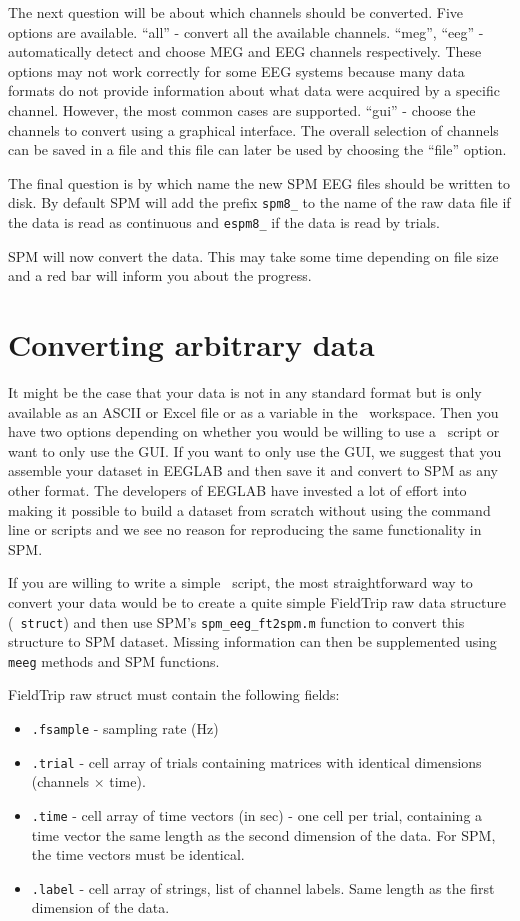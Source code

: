 The next question will be about which channels should be converted. Five options are available. ``all'' - convert all the available channels. ``meg'', ``eeg'' - automatically detect and choose MEG and EEG channels respectively. These options may not work correctly for some EEG systems because many data formats do not provide information about what data were acquired by a specific channel. However, the most common cases are supported. ``gui'' - choose the channels to convert using a graphical interface. The overall selection of channels can be saved in a file and this file can later be used by choosing the ``file'' option.

The final question is by which name the new SPM EEG files should be written to disk. By default SPM will add the prefix \texttt{spm8\_} to the name of the raw data file if the data is read as continuous and \texttt{espm8\_} if the data is read by trials.

SPM will now convert the data. This may take some time depending on file size and a red bar will inform you about the progress.


\section{Converting arbitrary data}
It might be the case that your data is not in any standard format but is only available as an ASCII or Excel file or as a variable in the \matlab\ workspace. Then you have two options depending on whether you would be willing to use a \matlab\ script or want to only use the GUI. If you want to only use the GUI, we suggest that you assemble your dataset in EEGLAB and then  save it and convert to SPM as any other format. The developers of EEGLAB have invested a lot of effort into making it possible to build a dataset from scratch without using the command line or scripts and we see no reason for reproducing the same functionality in SPM.

If you are willing to write a simple \matlab\ script, the most straightforward way to convert your data would be to create a quite simple FieldTrip raw data structure (\matlab\ \texttt{struct}) and then use SPM's \texttt{spm\_eeg\_ft2spm.m} function to convert this structure to SPM dataset. Missing information can then be supplemented using \texttt{meeg} methods and SPM functions.

FieldTrip raw struct must contain the following fields:

\begin{itemize}
\item \texttt{.fsample} - sampling rate (Hz)
\item \texttt{.trial} - cell array of trials containing matrices with identical dimensions (channels $\times$ time). 
\item \texttt{.time} - cell array of time vectors (in sec) - one cell per trial, containing a time vector the same length as the second dimension of the data. For SPM, the time vectors must be identical.
\item \texttt{.label} - cell array of strings, list of channel labels. Same length as the first dimension of the data.
\end{itemize}

